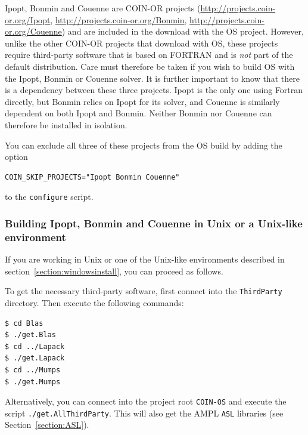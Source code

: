 \documentclass[11pt]{article}
\renewcommand{\_}{{\char"5F}}
\renewcommand{\{}{{\char"7B}}
\renewcommand{\}}{{\char"7D}}
\renewcommand{\^}{{\char"0D}}
\renewcommand{\'}{{\char"0D}}
\newif\ifipopt  \ipopttrue      %
\begin{document}
%
%
%
Ipopt, Bonmin and Couenne are COIN-OR projects 
(\url{http://projects.coin-or.org/Ipopt}, \url{http://projects.coin-or.org/Bonmin}, \url{http://projects.coin-or.org/Couenne})
and are included in the download with the OS project.
However, unlike the other COIN-OR projects that download with OS, these projects require third-party software
that is based on FORTRAN and is {\it not} part of the default distribution. Care must therefore be taken if
you wish to build OS with the Ipopt, Bonmin or Couenne solver. It is further important to know that there is a 
dependency between these three projects. Ipopt is the only one using Fortran directly, but Bonmin relies on Ipopt
for its solver, and Couenne is similarly dependent on both Ipopt and Bonmin. Neither Bonmin nor Couenne can therefore 
be installed in isolation.

You can exclude all three of these projects from the OS build by adding the option

\begin{verbatim}
COIN_SKIP_PROJECTS="Ipopt Bonmin Couenne"
\end{verbatim}
to the {\tt configure} script.

\ifipopt
\subsubsection{Building Ipopt, Bonmin and Couenne in Unix or a Unix-like environment} \label{section:ipopt-unix}
If you are working in Unix or one of the Unix-like environments described in
section~\ref{section:windowsinstall}, you can proceed as follows.
\else
If you do choose to build {\tt Ipopt}, {\tt Bonmin} and {\tt Couenne}, it is best to work in Unix or one of the 
Unix-like environments described in Section~\ref{section:windowsinstall} (we recommend MSYS)\index{MSYS}.
\fi
To get the necessary third-party software, first
connect into the {\tt ThirdParty} directory. Then execute the following commands:

\begin{verbatim}
$ cd Blas
$ ./get.Blas
$ cd ../Lapack
$ ./get.Lapack
$ cd ../Mumps
$ ./get.Mumps
\end{verbatim}

Alternatively, you can connect into the project root {\tt COIN-OS} and execute the script {\tt ./get.AllThirdParty}.
This will also get the AMPL {\tt ASL} libraries (see Section~\ref{section:ASL}).
\end{document}
